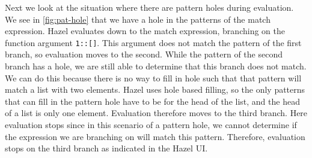 Next we look at the situation where there are pattern holes during evaluation. 
We see in \autoref{fig:pat-hole} that we have a hole in the patterns of the match expression. 
Hazel evaluates down to the match expression, branching on the function argument \texttt{1::[]}. 
This argument does not match the pattern of the first branch, so evaluation moves to the second. 
While the pattern of the second branch has a hole, we are still able to determine that this branch does not match. 
We can do this because there is no way to fill in hole  such that that pattern will match a list with two elements. 
Hazel uses hole based filling, so the only patterns that can fill in the pattern hole have to be for the head of the list, and the head of a list is only one element. 
Evaluation therefore moves to the third branch. 
Here evaluation stops since in this scenario of a pattern hole, we cannot determine if the expression we are branching on will match this pattern. 
Therefore, evaluation stops on the third branch as indicated in the Hazel UI. 
